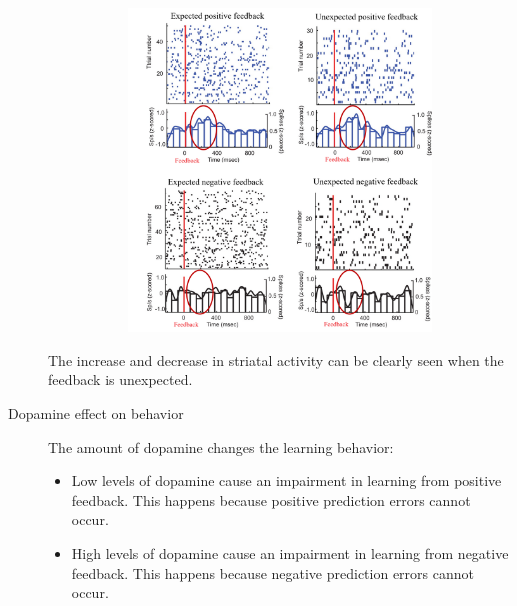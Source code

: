 \begin{description}
\begin{@empty}
\begin{example}
\begin{figure}[H]
\begin{subfigure}{0.55\linewidth}
                        \includegraphics[width=\linewidth]{./img/instrumental_dopamine_sn2.png}
                    \end{subfigure}
                \end{figure}

                The increase and decrease in striatal activity can be clearly seen when the feedback is unexpected.
            \end{example}
        \end{@empty}

    \item[Dopamine effect on behavior] 
        The amount of dopamine changes the learning behavior:
        \begin{itemize}
            \item Low levels of dopamine cause an impairment in learning from positive feedback.
                This happens because positive prediction errors cannot occur.
            
            \item High levels of dopamine cause an impairment in learning from negative feedback.
                This happens because negative prediction errors cannot occur.
        \end{itemize}


\end{description}
